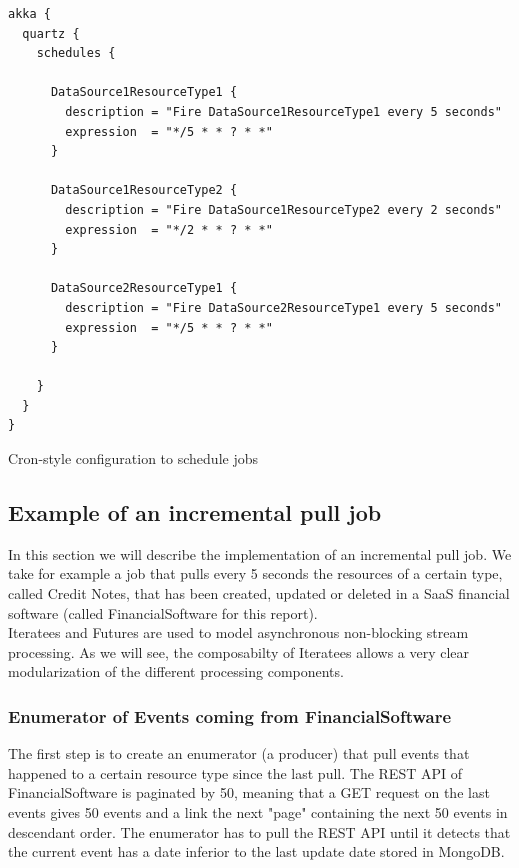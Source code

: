 \begin{listing}[h]
\begin{verbatim}
akka {
  quartz {
    schedules {

      DataSource1ResourceType1 {
        description = "Fire DataSource1ResourceType1 every 5 seconds"
        expression  = "*/5 * * ? * *"
      }

      DataSource1ResourceType2 {
        description = "Fire DataSource1ResourceType2 every 2 seconds"
        expression  = "*/2 * * ? * *"
      }

      DataSource2ResourceType1 {
        description = "Fire DataSource2ResourceType1 every 5 seconds"
        expression  = "*/5 * * ? * *"
      }
        
    }
  }
}
\end{verbatim}
\caption{Cron-style configuration to schedule jobs}
\label{lst:configquartz}
\end{listing}

\subsection{Example of an incremental pull job}

In this section we will describe the implementation of an incremental pull job. We take for example a job that pulls every 5 seconds the resources of a certain type, called Credit Notes, that has been created, updated or deleted in a SaaS financial software (called FinancialSoftware for this report).
\\

Iteratees and Futures are used to model asynchronous non-blocking stream processing. As we will see, the composabilty of Iteratees allows a very clear modularization of the different processing components. 

\subsubsection{Enumerator of Events coming from FinancialSoftware}

The first step is to create an enumerator (a producer) that pull events that happened to a certain resource type since the last pull. The REST API
of FinancialSoftware is paginated by 50, meaning that a GET request on the last events gives 50 events and a link the next "page" containing the next 50 events in descendant order.
The enumerator has to pull the REST API until it detects that the current event has a date inferior to the last update date stored in MongoDB.
\\

